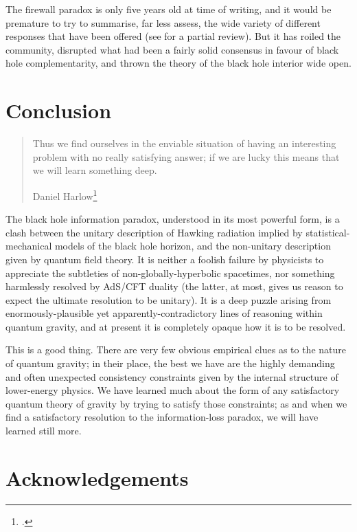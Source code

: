 \documentclass{article}
\begin{document}
The firewall paradox is only five years old at time of writing, and it would be premature to try to summarise, far less assess, the wide variety of different responses that have been offered (see  for a partial review). But it has roiled the community, disrupted what had been a fairly solid consensus in favour of black hole complementarity, and thrown the theory of the black hole interior wide open.

\section{Conclusion}\label{conclusion}

\begin{quote}
Thus we find ourselves in the enviable situation of having an interesting problem with no really satisfying answer; if we are lucky this means that we will learn something deep.

\begin{flushright}
Daniel Harlow\footnote{.}
\end{flushright}
\end{quote}

The black hole information paradox, understood in its most powerful form, is a clash between the unitary description of Hawking radiation implied by statistical-mechanical models of the black hole horizon, and the non-unitary description given by quantum field theory. It is neither a foolish failure by physicists to appreciate the subtleties of non-globally-hyperbolic spacetimes, nor something harmlessly resolved by AdS/CFT duality (the latter, at most, gives us reason to expect the ultimate resolution to be unitary). It is a deep puzzle arising from enormously-plausible yet apparently-contradictory lines of reasoning within quantum gravity, and at present it is completely opaque how it is to be resolved.

This is a good thing. There are very few obvious empirical clues as to the nature of quantum gravity; in their place, the best we have are the highly demanding and often unexpected consistency constraints given by the internal structure of lower-energy physics. We have learned much about the form of any satisfactory quantum theory of gravity by trying to satisfy those constraints; as and when we find a satisfactory resolution to the information-loss paradox, we will have learned still more.

\section*{Acknowledgements}
\end{document}
